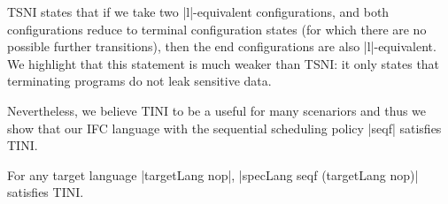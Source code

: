 TSNI states that if we take two |l|-equivalent configurations, and both
configurations reduce to terminal configuration states (for which there are no
possible further transitions), then the end configurations are also
|l|-equivalent.
%
We highlight that this statement is much weaker than TSNI: it only states that
terminating programs do not leak sensitive data.
 
Nevertheless, we believe TINI to be a useful for many scenariors and thus we
show that our IFC language with the sequential scheduling policy |seqf|
satisfies TINI.
%
\begin{theorem}
  \label{thm:seq-tini}
For any target language |targetLang nop|, |specLang seqf (targetLang
nop)| satisfies TINI.
\end{theorem}
